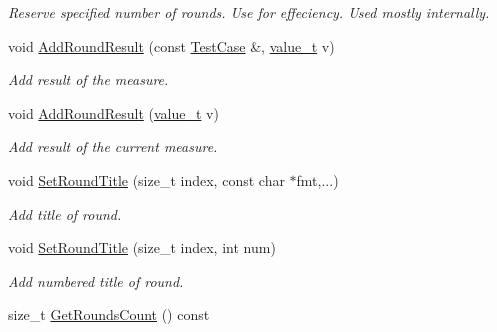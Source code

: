 \begin{DoxyCompactItemize}
\begin{DoxyCompactList}\small\item\em Reserve specified number of rounds. Use for effeciency. Used mostly internally. \end{DoxyCompactList}\item 
\hypertarget{classStatisticsCollector_a101c46d7b31ca0a1c2757e33283527a1}{}void \hyperlink{classStatisticsCollector_a101c46d7b31ca0a1c2757e33283527a1}{Add\+Round\+Result} (const \hyperlink{structStatisticsCollector_1_1TestCase}{Test\+Case} \&, \hyperlink{classvalue__t}{value\+\_\+t} v)\label{classStatisticsCollector_a101c46d7b31ca0a1c2757e33283527a1}

\begin{DoxyCompactList}\small\item\em Add result of the measure. \end{DoxyCompactList}\item 
\hypertarget{classStatisticsCollector_a05ee2c788154d7ee6b5f83de061c9d57}{}void \hyperlink{classStatisticsCollector_a05ee2c788154d7ee6b5f83de061c9d57}{Add\+Round\+Result} (\hyperlink{classvalue__t}{value\+\_\+t} v)\label{classStatisticsCollector_a05ee2c788154d7ee6b5f83de061c9d57}

\begin{DoxyCompactList}\small\item\em Add result of the current measure. \end{DoxyCompactList}\item 
\hypertarget{classStatisticsCollector_a073b6c1de9730c9f255d42156067f49c}{}void \hyperlink{classStatisticsCollector_a073b6c1de9730c9f255d42156067f49c}{Set\+Round\+Title} (size\+\_\+t index, const char $\ast$fmt,...)\label{classStatisticsCollector_a073b6c1de9730c9f255d42156067f49c}

\begin{DoxyCompactList}\small\item\em Add title of round. \end{DoxyCompactList}\item 
\hypertarget{classStatisticsCollector_ac723845e4a644e4ae9b0483d147b637e}{}void \hyperlink{classStatisticsCollector_ac723845e4a644e4ae9b0483d147b637e}{Set\+Round\+Title} (size\+\_\+t index, int num)\label{classStatisticsCollector_ac723845e4a644e4ae9b0483d147b637e}

\begin{DoxyCompactList}\small\item\em Add numbered title of round. \end{DoxyCompactList}\item 
\hypertarget{classStatisticsCollector_a1114d2953c4188a923ca96f1b3e05cf6}{}size\+\_\+t \hyperlink{classStatisticsCollector_a1114d2953c4188a923ca96f1b3e05cf6}{Get\+Rounds\+Count} () const \label{classStatisticsCollector_a1114d2953c4188a923ca96f1b3e05cf6}


\end{DoxyCompactItemize}

